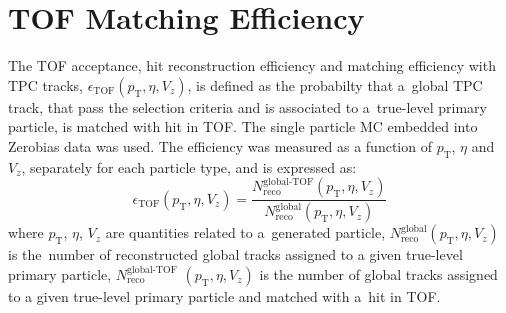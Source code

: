 \section{TOF Matching Efficiency}\label{section:star_TOFeffi}
The TOF acceptance, hit reconstruction efficiency and matching efficiency with TPC tracks,  $\epsilon_\textrm{TOF}\left(p_\textrm{T},\eta,V_{z}\right)$, is defined as the probabilty that a~global TPC track, that pass the selection criteria and is associated to a~true-level primary particle, is matched with hit in TOF. The  single particle MC embedded into Zerobias data was used. The efficiency was measured as a function of $p_\textrm{T}$, $\eta$ and $V_z$, separately for each particle type, and is expressed as:
\begin{equation}
\epsilon_\textrm{TOF}\left(p_\textrm{T},\eta,V_{z}\right)=\frac{N_\textrm{reco}^\textrm{global-TOF}\left(p_\textrm{T},\eta, V_z\right)}{N_\textrm{reco}^\textrm{global}\left(p_\textrm{T},\eta, V_z\right)}
\end{equation}
where $p_\textrm{T}$, $\eta$, $V_z$ are quantities related to a~generated particle, $N_\textrm{reco}^\textrm{global}\left(p_\textrm{T},\eta, V_z\right)$ is the~number of reconstructed global tracks assigned to a given true-level primary particle, $N_\textrm{reco}^\textrm{global-TOF}$ $\left(p_\textrm{T},\eta, V_z\right)$ is the number of global tracks assigned to a given true-level primary particle and matched with a~hit in TOF.

